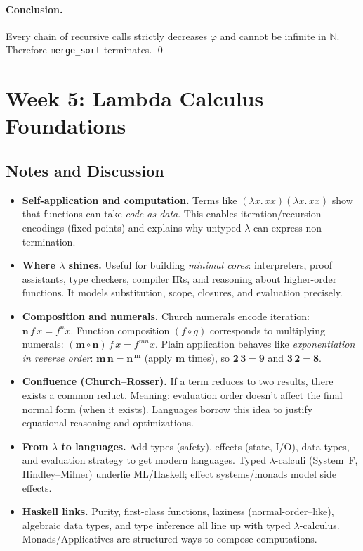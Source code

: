 \documentclass{article}
\theoremstyle{theorem}
\theoremstyle{definition}
\theoremstyle{remark}
\begin{document}
\paragraph{Conclusion.}
Every chain of recursive calls strictly decreases $\varphi$ and cannot be infinite in $\mathbb{N}$. Therefore \texttt{merge\_sort} terminates. \qed

\section{Week 5: Lambda Calculus Foundations}

\subsection{Notes and Discussion}
\begin{itemize}
  \item \textbf{Self-application and computation.} Terms like $(\lambda x.\,xx)(\lambda x.\,xx)$ show that functions can take \emph{code as data}. This enables iteration/recursion encodings (fixed points) and explains why untyped $\lambda$ can express non-termination.
  \item \textbf{Where $\lambda$ shines.} Useful for building \emph{minimal cores}: interpreters, proof assistants, type checkers, compiler IRs, and reasoning about higher-order functions. It models substitution, scope, closures, and evaluation precisely.
  \item \textbf{Composition and numerals.} Church numerals encode iteration: $\mathbf{n}\,f\,x = f^{n}x$. Function composition $(f \circ g)$ corresponds to multiplying numerals: $(\mathbf{m}\circ\mathbf{n})\,f\,x = f^{mn}x$. Plain application behaves like \emph{exponentiation in reverse order}: $\mathbf{m}\,\mathbf{n} = \mathbf{n}^{\,\mathbf{m}}$ (apply $\mathbf{m}$ times), so $\mathbf{2}\,\mathbf{3}=\mathbf{9}$ and $\mathbf{3}\,\mathbf{2}=\mathbf{8}$.
  \item \textbf{Confluence (Church–Rosser).} If a term reduces to two results, there exists a common reduct. Meaning: evaluation order doesn’t affect the final normal form (when it exists). Languages borrow this idea to justify equational reasoning and optimizations.
  \item \textbf{From $\lambda$ to languages.} Add types (safety), effects (state, I/O), data types, and evaluation strategy to get modern languages. Typed $\lambda$-calculi (System~F, Hindley–Milner) underlie ML/Haskell; effect systems/monads model side effects.
  \item \textbf{Haskell links.} Purity, first-class functions, laziness (normal-order–like), algebraic data types, and type inference all line up with typed $\lambda$-calculus. Monads/Applicatives are structured ways to compose computations.

\end{itemize}
\end{document}
